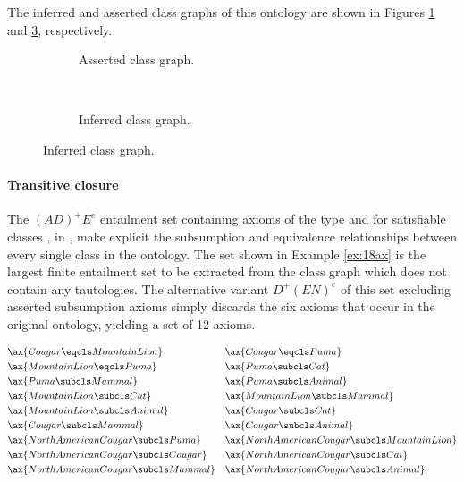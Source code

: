 The inferred and asserted class graphs of this ontology are shown in Figures \ref{fig:asserted} and \ref{fig:inferred}, respectively.


\begin{figure}
\centering
		\begin{subfigure}{0.4\textwidth}
                \centering
                
                \caption{Asserted class graph.}
        	\label{fig:asserted}
        \end{subfigure}%
        ~ %
		\begin{subfigure}{0.6\textwidth}
                \centering
                
                \caption{Inferred class graph.}
        	\label{fig:inferred}
        \end{subfigure}
\end{figure}


\paragraph{Transitive closure}

The $(AD)^{+}E^{e}$ entailment set containing axioms of the type  and  for satisfiable classes ,  in \sig{\O}, make explicit the subsumption and equivalence relationships between every single class in the ontology. The set shown in Example \ref{ex:18ax} is the largest finite entailment set to be extracted from the class graph which does not contain any tautologies. The alternative variant $D^{+}(EN)^{e}$ of this set excluding asserted subsumption axioms simply discards the six axioms that occur in the original ontology, yielding a set of 12 axioms.

\begin{examp}
\begin{align*}
& \ax{Cougar \eqcls MountainLion}&&\ax{Cougar \eqcls Puma} \\
& \ax{MountainLion \eqcls Puma} && \ax{Puma \subcls Cat} \\
& \ax{Puma \subcls Mammal} &&\ax{Puma \subcls Animal}\\
& \ax{MountainLion \subcls Cat} &&\ax{MountainLion\subcls Mammal} \\
&\ax{MountainLion \subcls Animal} && \ax{Cougar \subcls Cat} \\
&\ax{Cougar\subcls Mammal}&&\ax{Cougar \subcls Animal}\\
& \ax{NorthAmericanCougar \subcls Puma} &&\ax{NorthAmericanCougar \subcls MountainLion} \\
&\ax{NorthAmericanCougar \subcls Cougar} && \ax{NorthAmericanCougar \subcls Cat} \\
&\ax{NorthAmericanCougar\subcls Mammal} &&\ax{NorthAmericanCougar \subcls Animal}\\
\end{align*}\label{ex:18ax}
\end{examp}

